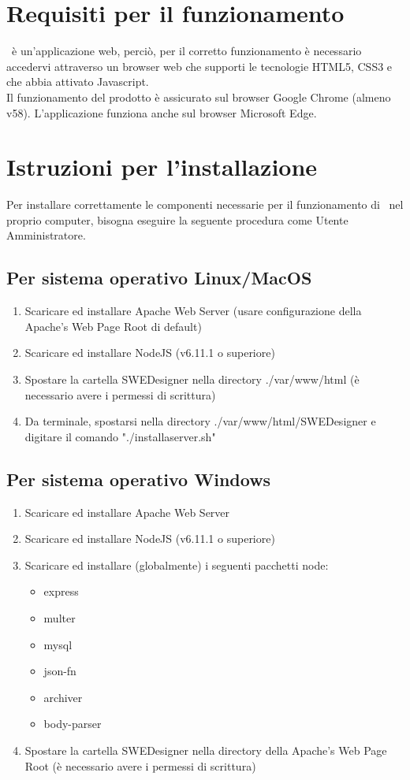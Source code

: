 \documentclass[../ManualeUtente.tex]{subfiles}
\begin{document}
	\section{Requisiti per il funzionamento}
		\progetto\ è un'applicazione web, perciò, per il corretto funzionamento
		è necessario accedervi attraverso un browser web che supporti le
		tecnologie HTML5, CSS3 e che abbia attivato Javascript.\\
		Il funzionamento del prodotto è assicurato sul browser Google Chrome (almeno v58).
		L'applicazione funziona anche sul browser Microsoft Edge.
	\section{Istruzioni per l'installazione}\label{sez:installIstr}
		Per installare correttamente le componenti necessarie per il funzionamento di \progetto\ nel proprio computer,
		bisogna eseguire la seguente procedura come Utente Amministratore.
		\subsection{Per sistema operativo Linux/MacOS}
			\begin{enumerate}
				\item Scaricare ed installare Apache Web Server (usare configurazione della
				Apache's Web Page Root di default)
				\item Scaricare ed installare NodeJS (v6.11.1 o superiore)
	 			\item Spostare la cartella SWEDesigner nella directory ./var/www/html (è necessario avere i permessi
	 			di scrittura)
	 			\item Da terminale, spostarsi nella directory ./var/www/html/SWEDesigner e digitare il comando
	 			"./installaserver.sh"
			\end{enumerate}
		\subsection{Per sistema operativo Windows}
			\begin{enumerate}
				\item Scaricare ed installare Apache Web Server
	 			\item Scaricare ed installare NodeJS (v6.11.1 o superiore)
 				\item Scaricare ed installare (globalmente) i seguenti pacchetti node:
 				\begin{itemize}
 					\item express
 					\item multer
 					\item mysql
 					\item json-fn
 					\item archiver
 					\item body-parser
 				\end{itemize}
 				\item Spostare la cartella SWEDesigner nella directory della Apache's Web Page Root
 				(è necessario avere i permessi di scrittura)
			\end{enumerate}
\end{document}
